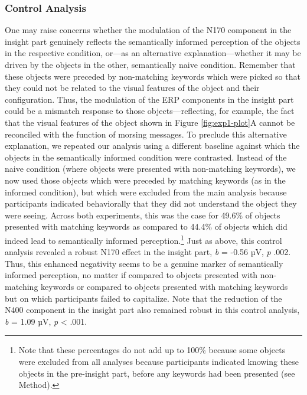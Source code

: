 \documentclass[
  english,
  doc,12pt,twoside,floatsintext]{apa7}
\begin{document}
\hypertarget{control-analysis}{%
\subsubsection{Control Analysis}\label{control-analysis}}

One may raise concerns whether the modulation of the N170 component in the insight part genuinely reflects the semantically informed perception of the objects in the respective condition, or---as an alternative explanation---whether it may be driven by the objects in the other, semantically naive condition. Remember that these objects were preceded by non-matching keywords which were picked so that they could not be related to the visual features of the object and their configuration. Thus, the modulation of the ERP components in the insight part could be a mismatch response to those objects---reflecting, for example, the fact that the visual features of the object shown in Figure \ref{fig:exp1-plot}A cannot be reconciled with the function of morsing messages. To preclude this alternative explanation, we repeated our analysis using a different baseline against which the objects in the semantically informed condition were contrasted. Instead of the naive condition (where objects were presented with non-matching keywords), we now used those objects which were preceded by matching keywords (as in the informed condition), but which were excluded from the main analysis because participants indicated behaviorally that they did not understand the object they were seeing. Across both experiments, this was the case for 49.6\% of objects presented with matching keywords as compared to 44.4\% of objects which did indeed lead to semantically informed perception.\footnote{Note that these percentages do not add up to 100\% because some objects were excluded from all analyses because participants indicated knowing these objects in the pre-insight part, before any keywords had been presented (see Method).} Just as above, this control analysis revealed a robust N170 effect in the insight part, \emph{b} = -0.56 µV, \emph{p} .002. Thus, this enhanced negativity seems to be a genuine marker of semantically informed perception, no matter if compared to objects presented with non-matching keywords or compared to objects presented with matching keywords but on which participants failed to capitalize. Note that the reduction of the N400 component in the insight part also remained robust in this control analysis, \emph{b} = 1.09 µV, \emph{p} \textless{} .001.
\end{document}
